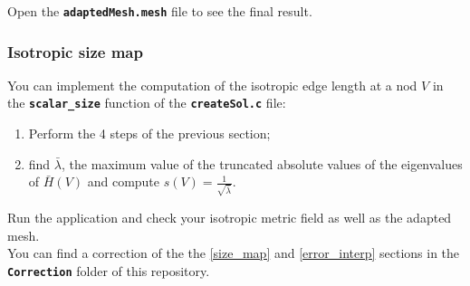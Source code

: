 \documentclass{article}
\newcommand{\ttb}[1]{\texttt{\textbf{#1}}}
\begin{document}
Open the \ttb{adaptedMesh.mesh} file to see the final result.

\subsubsection{Isotropic size map}
You can implement the computation of the isotropic edge length at a
nod $V$ in the \ttb{scalar\_size} function of the \ttb{createSol.c}
file:

\begin{enumerate}
\item Perform the 4 steps of the previous section;
\item find $\bar{\lambda}$, the maximum value of the truncated absolute values
  of the eigenvalues of $\bar{H}(V)$ and compute
  $ s(V) = \frac{1}{\sqrt{\bar{\lambda}}}$.
\end{enumerate}
Run the application and check your isotropic metric
field as well as the adapted mesh.\\

You can find a correction of the the \ref{size_map} and
\ref{error_interp} sections in the \ttb{Correction} folder of this repository.
\end{document}
